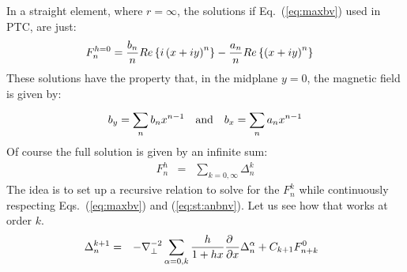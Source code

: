 \documentclass[11pt]{article} %
\def\eq#1{Eq.~(\ref{#1})}
\def\eqs#1{Eqs.~(\ref{#1})}
\def\eqe#1{(\ref{#1})}
\begin{document}
In a straight element, where %
$r=
\infty $,
the solutions if \eq{eq:maxbv} used in PTC, are just:
%
\begin{eqnarray}{F}_{n}^{h=
0}&={{b}_{n} \over n}Re\left\{{{i\left({x+iy}\right)}^{n}}\right\}-{{a}_{n} \over n}Re\left\{{{\left({x+iy}\right)}^{n}}\right\}  \label{eq:hsolv} \end{eqnarray}
%
%
These solutions have the property that, in the midplane $y=0$,  the magnetic field is given by:
%
\begin{eqnarray}{b}_{y}=
\sum\limits_{n}^{} {b}_{n}{x}^{n-1}~~~{\rm a}{\rm n}{\rm d} ~~~{b}_{x}=
\sum\limits_{n}^{} {a}_{n}{x}^{n-1} \label{eq:st:anbnv}\end{eqnarray}
%
%
Of course the full solution is given by an infinite sum:
%
\begin{eqnarray}{F}_{n}^{h} &=
& \sum\limits_{k=
0,\infty }^{} {\Delta }_{n}^{k}\label{fnkv}\end{eqnarray}
%
%
The idea is to set up a recursive relation to solve for the $F_n^k$ while continuously respecting \eqs{eq:maxbv} and \eqe{eq:st:anbnv}. Let us see how that works at order $k$. 
%
\begin{eqnarray}{\Delta }_{n}^{k+1} &=
&-{\nabla }_{\perp }^{-2}\sum\limits_{\alpha =
0,k}^{} {h \over 1+hx}{\partial \hphantom{x} \over \partial x}{\Delta }_{n}^{\alpha }+{C}_{k+1}{F}_{n+k}^{0}\ \ \label{eq:sol:anbnv}\end{eqnarray}
\end{document}
